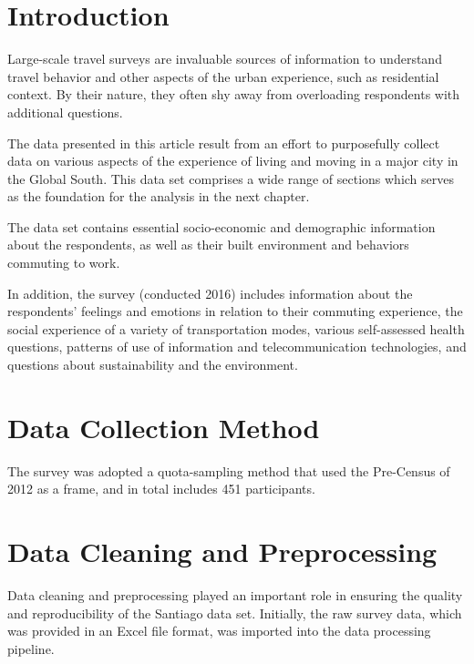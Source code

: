 \documentclass[
11pt, %
oneside, %
english, %
singlespacing, %
]{macthesis} %
\begin{document}
\hypertarget{introduction-2}{%
\section{Introduction}\label{introduction-2}}

Large-scale travel surveys are invaluable sources of information to understand travel behavior and other aspects of the urban experience, such as residential context. By their nature, they often shy away from overloading respondents with additional questions.

The data presented in this article result from an effort to purposefully collect data on various aspects of the experience of living and moving in a major city in the Global South. This data set comprises a wide range of sections which serves as the foundation for the analysis in the next chapter.

The data set contains essential socio-economic and demographic information about the respondents, as well as their built environment and behaviors commuting to work.

In addition, the survey (conducted 2016) includes information about the respondents' feelings and emotions in relation to their commuting experience, the social experience of a variety of transportation modes, various self-assessed health questions, patterns of use of information and telecommunication technologies, and questions about sustainability and the environment.

\hypertarget{data-collection-method}{%
\section{Data Collection Method}\label{data-collection-method}}

The survey was adopted a quota-sampling method that used the Pre-Census of 2012 as a frame, and in total includes 451 participants.

\hypertarget{data-cleaning-and-preprocessing}{%
\section{Data Cleaning and Preprocessing}\label{data-cleaning-and-preprocessing}}

Data cleaning and preprocessing played an important role in ensuring the quality and reproducibility of the Santiago data set. Initially, the raw survey data, which was provided in an Excel file format, was imported into the data processing pipeline.
\end{document}
